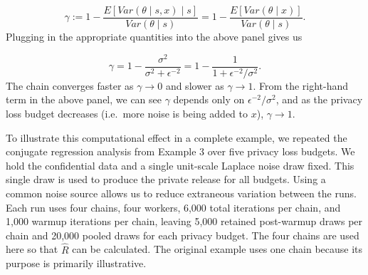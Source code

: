 \begin{equation*}
\gamma := 1 - \dfrac{E[Var(\theta \mid s, x) \mid s]}{Var(\theta \mid s)} = 1 - \dfrac{E[Var(\theta \mid x)]}{Var(\theta \mid s)}.
\end{equation*}
Plugging in the appropriate quantities into the above panel gives us

\begin{equation*}
\gamma = 1 - \dfrac{\sigma^2}{\sigma^2 + \epsilon^{-2}} = 1 - \dfrac{1}{1 + \epsilon^{-2}/\sigma^2}.
\end{equation*}
The chain converges faster as \(\gamma \to 0\) and slower as \(\gamma \to 1\).
From the right-hand term in the above panel, we can see \(\gamma\)
depends only on \(\epsilon^{-2}/\sigma^2\), and as the privacy loss budget decreases (i.e.~more noise is being added to \(x\)),
\(\gamma \to 1\).

To illustrate this computational effect in a complete example, we repeated
the conjugate regression analysis from Example 3 over five privacy loss
budgets. We hold the confidential data and a single unit-scale
Laplace noise draw fixed. This single draw is used to produce the
private release for all budgets. Using a common noise source allows us to reduce
extraneous variation between the runs. Each run uses four chains, four
workers, 6,000 total iterations per chain, and 1,000 warmup iterations per
chain, leaving 5,000 retained post-warmup draws per chain and 20,000 pooled
draws for each privacy budget. The four
chains are used here so that \(\widehat{R}\) can be calculated. The original
example uses one chain because its purpose is primarily illustrative.

